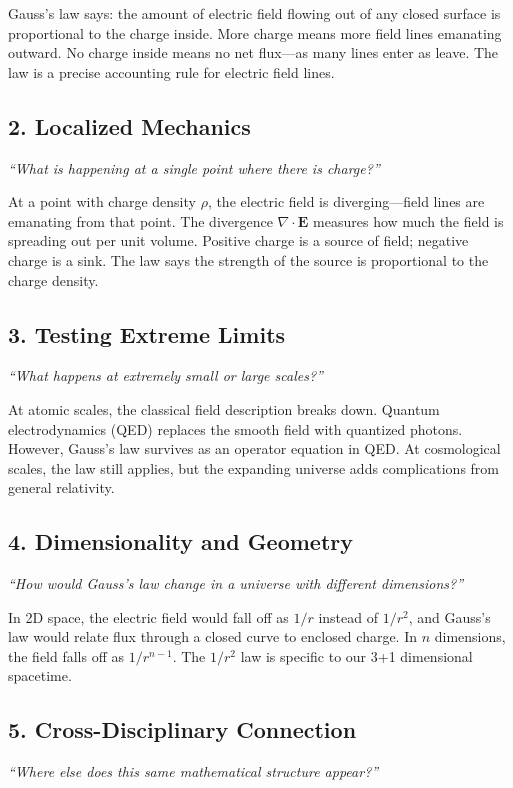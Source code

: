 Gauss's law says: the amount of electric field flowing out of any closed surface is proportional to the charge inside. More charge means more field lines emanating outward. No charge inside means no net flux---as many lines enter as leave. The law is a precise accounting rule for electric field lines.

\subsection*{2. Localized Mechanics}
\textit{``What is happening at a single point where there is charge?''}

At a point with charge density $\rho$, the electric field is diverging---field lines are emanating from that point. The divergence $\nabla \cdot \mathbf{E}$ measures how much the field is spreading out per unit volume. Positive charge is a source of field; negative charge is a sink. The law says the strength of the source is proportional to the charge density.

\subsection*{3. Testing Extreme Limits}
\textit{``What happens at extremely small or large scales?''}

At atomic scales, the classical field description breaks down. Quantum electrodynamics (QED) replaces the smooth field with quantized photons. However, Gauss's law survives as an operator equation in QED. At cosmological scales, the law still applies, but the expanding universe adds complications from general relativity.

\subsection*{4. Dimensionality and Geometry}
\textit{``How would Gauss's law change in a universe with different dimensions?''}

In 2D space, the electric field would fall off as $1/r$ instead of $1/r^2$, and Gauss's law would relate flux through a closed curve to enclosed charge. In $n$ dimensions, the field falls off as $1/r^{n-1}$. The $1/r^2$ law is specific to our 3+1 dimensional spacetime.

\subsection*{5. Cross-Disciplinary Connection}
\textit{``Where else does this same mathematical structure appear?''}

